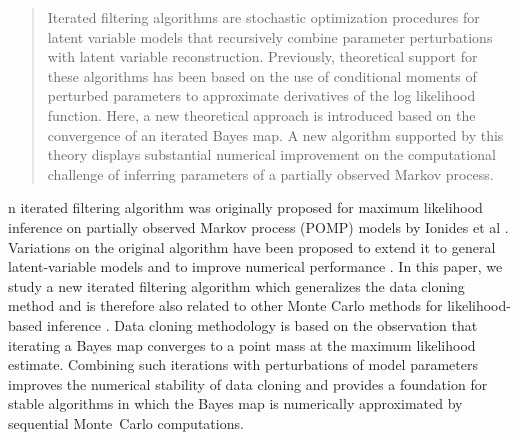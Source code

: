\documentclass{pnastwo}\usepackage[]{graphicx}\usepackage[]{color}
\begin{document}
\begin{article}
\begin{abstract}
{Iterated filtering algorithms are stochastic optimization procedures for latent variable models that recursively combine parameter perturbations with latent variable reconstruction.
Previously, theoretical support for these algorithms has been based on the use of conditional moments of perturbed parameters to approximate derivatives of the log likelihood function. 
Here, a new theoretical approach is introduced based on the convergence of an iterated Bayes map.
A new algorithm supported by this theory displays substantial numerical improvement on the computational challenge of inferring parameters of a partially observed Markov process.}
\end{abstract}



n iterated filtering algorithm was originally proposed for maximum likelihood inference on partially observed Markov process (POMP) models by Ionides et al \cite{ionides06-pnas}. 
Variations on the original algorithm have been proposed to extend it to general latent-variable models \cite{ionides11} and to improve numerical performance \cite{doucet13,lindstrom12}.
In this paper, we study a new iterated filtering algorithm which generalizes the data cloning method  \cite{lele07,lele10} and is therefore also related to other Monte Carlo methods for likelihood-based inference \cite{doucet02,gaetan03,jacquier07}.
Data cloning methodology is based on the observation that iterating a Bayes map converges to a point mass at the maximum likelihood estimate.
Combining such iterations with perturbations of model parameters improves the numerical stability of data cloning and provides a foundation for stable algorithms in which the Bayes map is numerically approximated by sequential Monte~Carlo computations.



\end{article}
\end{document}
